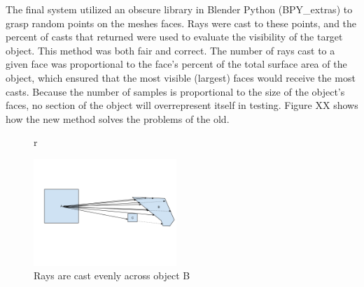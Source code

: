 The final system utilized an obscure library in Blender Python (BPY\_extras) to grasp random points on the meshes faces. Rays were cast to these points, and the percent of casts that returned were used to evaluate the visibility of the target object. This method was both fair and correct. The number of rays cast to a given face was proportional to the face's percent of the total surface area of the object, which ensured that the most visible (largest) faces would receive the most casts. Because the number of samples is proportional to the size of the object's faces, no section of the object will overrepresent itself in testing. Figure XX shows how the new method solves the problems of the old.

\begin{figure}{r}
	\begin{center}
	\includegraphics[width=0.48\textwidth]{figures/vision7.png}
	\end{center}
	\caption{Rays are cast evenly across object B}
\end{figure}

